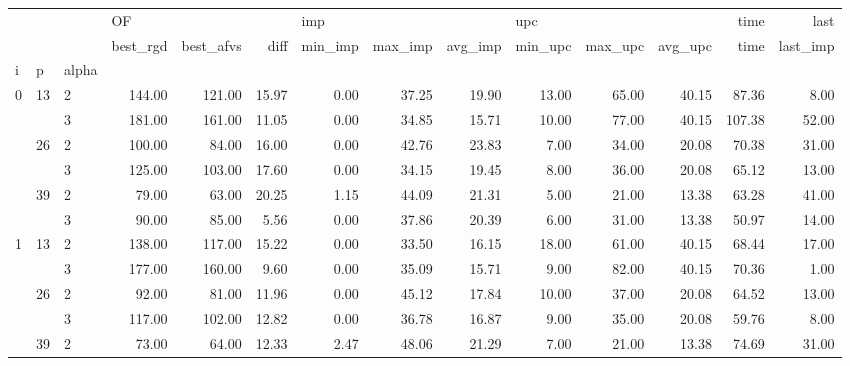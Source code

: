 \begin{tabular}{lllrrrrrrrrrrr}
\toprule
  &    &   & \multicolumn{3}{l}{OF} & \multicolumn{3}{l}{imp} & \multicolumn{3}{l}{upc} &   time &     last \\
  &    &   & best\_rgd & best\_afvs &  diff & min\_imp & max\_imp & avg\_imp & min\_upc & max\_upc & avg\_upc &   time & last\_imp \\
i & p & alpha &          &           &       &         &         &         &         &         &         &        &          \\
\midrule
\multirow{6}{*}{0} & \multirow{2}{*}{13} & 2 &   144.00 &    121.00 & 15.97 &    0.00 &   37.25 &   19.90 &   13.00 &   65.00 &   40.15 &  87.36 &     8.00 \\
  &    & 3 &   181.00 &    161.00 & 11.05 &    0.00 &   34.85 &   15.71 &   10.00 &   77.00 &   40.15 & 107.38 &    52.00 \\
\cline{2-14}
  & \multirow{2}{*}{26} & 2 &   100.00 &     84.00 & 16.00 &    0.00 &   42.76 &   23.83 &    7.00 &   34.00 &   20.08 &  70.38 &    31.00 \\
  &    & 3 &   125.00 &    103.00 & 17.60 &    0.00 &   34.15 &   19.45 &    8.00 &   36.00 &   20.08 &  65.12 &    13.00 \\
\cline{2-14}
  & \multirow{2}{*}{39} & 2 &    79.00 &     63.00 & 20.25 &    1.15 &   44.09 &   21.31 &    5.00 &   21.00 &   13.38 &  63.28 &    41.00 \\
  &    & 3 &    90.00 &     85.00 &  5.56 &    0.00 &   37.86 &   20.39 &    6.00 &   31.00 &   13.38 &  50.97 &    14.00 \\
\cline{1-14}
\cline{2-14}
\multirow{6}{*}{1} & \multirow{2}{*}{13} & 2 &   138.00 &    117.00 & 15.22 &    0.00 &   33.50 &   16.15 &   18.00 &   61.00 &   40.15 &  68.44 &    17.00 \\
  &    & 3 &   177.00 &    160.00 &  9.60 &    0.00 &   35.09 &   15.71 &    9.00 &   82.00 &   40.15 &  70.36 &     1.00 \\
\cline{2-14}
  & \multirow{2}{*}{26} & 2 &    92.00 &     81.00 & 11.96 &    0.00 &   45.12 &   17.84 &   10.00 &   37.00 &   20.08 &  64.52 &    13.00 \\
  &    & 3 &   117.00 &    102.00 & 12.82 &    0.00 &   36.78 &   16.87 &    9.00 &   35.00 &   20.08 &  59.76 &     8.00 \\
\cline{2-14}
  & \multirow{2}{*}{39} & 2 &    73.00 &     64.00 & 12.33 &    2.47 &   48.06 &   21.29 &    7.00 &   21.00 &   13.38 &  74.69 &    31.00 \\

\end{tabular}
